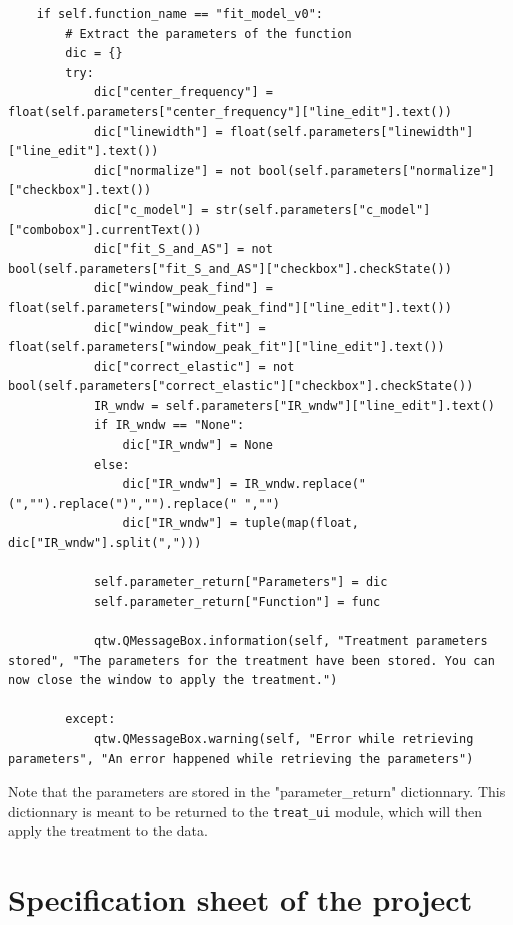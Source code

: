 \documentclass{book}
\begin{document}
\begin{enumerate}
\begin{lstlisting}
    if self.function_name == "fit_model_v0":
        # Extract the parameters of the function
        dic = {}
        try:
            dic["center_frequency"] = float(self.parameters["center_frequency"]["line_edit"].text())
            dic["linewidth"] = float(self.parameters["linewidth"]["line_edit"].text())
            dic["normalize"] = not bool(self.parameters["normalize"]["checkbox"].text())
            dic["c_model"] = str(self.parameters["c_model"]["combobox"].currentText())
            dic["fit_S_and_AS"] = not bool(self.parameters["fit_S_and_AS"]["checkbox"].checkState())
            dic["window_peak_find"] = float(self.parameters["window_peak_find"]["line_edit"].text()) 
            dic["window_peak_fit"] = float(self.parameters["window_peak_fit"]["line_edit"].text())
            dic["correct_elastic"] = not bool(self.parameters["correct_elastic"]["checkbox"].checkState())
            IR_wndw = self.parameters["IR_wndw"]["line_edit"].text()
            if IR_wndw == "None": 
                dic["IR_wndw"] = None
            else:
                dic["IR_wndw"] = IR_wndw.replace("(","").replace(")","").replace(" ","")
                dic["IR_wndw"] = tuple(map(float, dic["IR_wndw"].split(",")))

            self.parameter_return["Parameters"] = dic
            self.parameter_return["Function"] = func

            qtw.QMessageBox.information(self, "Treatment parameters stored", "The parameters for the treatment have been stored. You can now close the window to apply the treatment.")
        
        except:
            qtw.QMessageBox.warning(self, "Error while retrieving parameters", "An error happened while retrieving the parameters")
\end{lstlisting}
        Note that the parameters are stored in the "parameter\_return" dictionnary. This dictionnary is meant to be returned to the \texttt{treat\_ui} module, which will then apply the treatment to the data.
        \end{enumerate}

\chapter{Specification sheet of the project}
\end{document}
